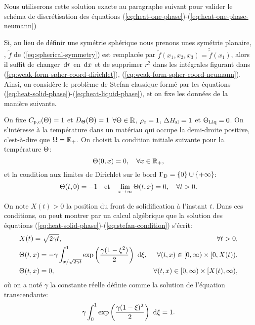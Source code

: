 Nous utiliserons cette solution exacte au paragraphe suivant pour valider le
schéma de discrétisation des équations
(\ref{eq:heat-one-phase})-(\ref{eq:heat-one-phase-neumann})

Si, au lieu de définir une symétrie sphérique nous prenons unes
symétrie planaire, \ie, $\tilde f$ de (\ref{eq:spherical-symmetry})
est remplacée par $\tilde f(x_1, x_2, x_3) = \tilde{\tilde f}(x_1)$,
alors il suffit de changer $\,\mathrm dr$ en $\,\mathrm dx$ et de supprimer
$r^2$ dans les intégrales figurant dans
(\ref{eq:weak-form-spher-coord-dirichlet}),
(\ref{eq:weak-form-spher-coord-neumann}). Ainsi, on considère le
problème de Stefan classique formé par les équations
(\ref{eq:heat-solid-phase})-(\ref{eq:heat-liquid-phase}), et on fixe
les données de la manière suivante.


On fixe $C_{\mathrm{p,e}}(\Theta) = 1$ et
$D_\Theta(\Theta)=1$ $\forall\Theta \in \mathbb
R$, $\rho_\mathrm{e} = 1$, $\Delta H_\mathrm{sl} = 1$ et $\Theta_\text{Liq} =
0$. On s'intéresse à la température dans un matériau qui occupe la
demi-droite positive, c'est-à-dire que $\Omega = \mathbb R_+$. On choisit
la condition initiale suivante pour la température $\Theta$:
\begin{equation}
  \Theta(0, x) = 0, \quad \forall x\in\mathbb R_+,
\end{equation}
et la condition aux limites de Dirichlet sur le bord $\Gamma_\mathrm{D} =
\left\{ 0 \right\}\cup \left\{ +\infty \right\}$:
\begin{equation}
  \Theta(t, 0) = -1 \quad\text{et}\quad
  \lim_{x\to\infty}\Theta(t, x) = 0, \quad \forall t > 0.
\end{equation}

On note $X(t) > 0$ la position du front de solidification à l'instant
$t$. Dans ces conditions, on peut montrer \cite{HillStefanProblems}
par un calcul algébrique que la solution des équations
(\ref{eq:heat-solid-phase})-(\ref{eq:stefan-condition}) s'écrit:
\begin{align}
  & X(t) = \sqrt{2\gamma t},& \forall t > 0,\label{eq:neumann-sol-frontier}\\
  & \temperature(t, x) = -\gamma\int_{x / \sqrt{2\gamma
      t}}^1\exp\parent{\frac{\gamma(1 - \xi^2)}{2}}\, \intd{\xi},%
  & \forall (t, x) \in [0,\infty)\times[0,X(t)),\label{eq:neumann-sol-solid-phase}\\
    & \temperature(t, x) = 0,
    & \forall (t, x) \in [0,\infty)\times[X(t), \infty),\label{eq:neumann-sol-liquid-phase}
\end{align}
où on a noté $\gamma$ la constante réelle définie comme la solution de
l'équation transcendante:
\begin{equation}
  \gamma \int_0^1\exp\left( \frac{\gamma(1 - \xi)^2}{2} \right)\,\,\mathrm d\xi
  = 1.
\end{equation}

